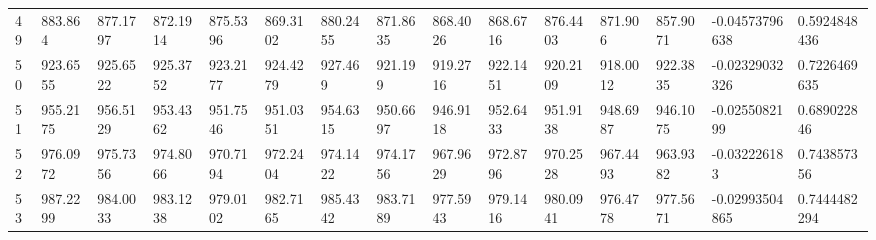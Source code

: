 \begin{landscape}
{\begin{longtable}{@{}lllllllllllllll@{}}
		49                                           & 883.864                  & 877.1797                 & 872.1914                 & 875.5396                 & 869.3102                 & 880.2455                 & 871.8635                 & 868.4026                 & 868.6716                 & 876.4403                 & 871.906                  & 857.9071                 & -0.04573796638                                                         & 0.5924848436                                    \\
		50                                           & 923.6555                 & 925.6522                 & 925.3752                 & 923.2177                 & 924.4279                 & 927.469                  & 921.199                  & 919.2716                 & 922.1451                 & 920.2109                 & 918.0012                 & 922.3835                 & -0.02329032326                                                         & 0.7226469635                                    \\
		51                                           & 955.2175                 & 956.5129                 & 953.4362                 & 951.7546                 & 951.0351                 & 954.6315                 & 950.6697                 & 946.9118                 & 952.6433                 & 951.9138                 & 948.6987                 & 946.1075                 & -0.0255082199                                                          & 0.689022846                                     \\
		52                                           & 976.0972                 & 975.7356                 & 974.8066                 & 970.7194                 & 972.2404                 & 974.1422                 & 974.1756                 & 967.9629                 & 972.8796                 & 970.2528                 & 967.4493                 & 963.9382                 & -0.032226183                                                           & 0.743857356                                     \\
		53                                           & 987.2299                 & 984.0033                 & 983.1238                 & 979.0102                 & 982.7165                 & 985.4342                 & 983.7189                 & 977.5943                 & 979.1416                 & 980.0941                 & 976.4778                 & 977.5671                 & -0.02993504865                                                         & 0.7444482294                                    \\

\end{longtable}}
\end{landscape}
